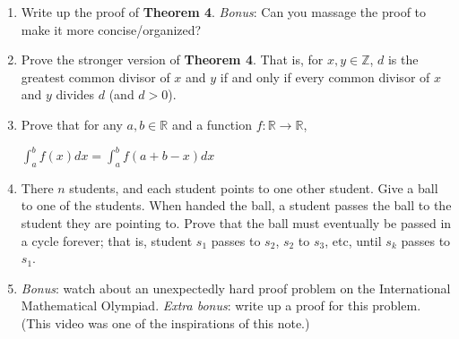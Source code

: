 \documentclass[11pt]{article}
\begin{document}
    \begin{enumerate}
        \item
        Write up the proof of \textbf{Theorem 4}. \textit{Bonus}: Can you massage the proof to make it
        more concise/organized?
        
        \item
        Prove the stronger version of \textbf{Theorem 4}. That is, for $x,y\in\mathbb Z$,
        $d$ is the greatest common divisor of $x$ and $y$ if and only if every common divisor
        of $x$ and $y$ divides $d$ (and $d>0$).
        
        \item
        Prove that for any $a,b\in\mathbb R$ and a function $f:\mathbb R\rightarrow\mathbb R$,
        
        $\displaystyle\int_a^bf(x)dx=\int_a^bf(a+b-x)dx$
        
        \item
        There $n$ students, and each student points to one other student. Give
        a ball to one of the students. When handed the ball, a student passes the ball
        to the student they are pointing to. Prove that the ball must eventually be
        passed in a cycle forever; that is, student $s_1$ passes to $s_2$, $s_2$ to $s_3$,
        etc, until $s_k$ passes to $s_1$.
        
        \item
        \textit{Bonus}: watch \href{https://youtu.be/M64HUIJFTZM}{\color{blue}{this video}} about an unexpectedly
        hard proof problem on the International Mathematical Olympiad. \textit{Extra bonus}: write
        up a proof for this problem. (This video was one of the inspirations of this note.)
        
    \end{enumerate}
\end{document}
